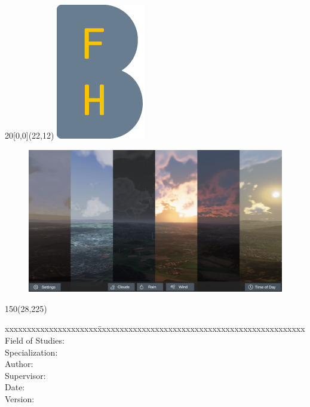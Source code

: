 
\begin{titlepage}

\setlength{\unitlength}{1mm}

\begin{textblock}{20}[0,0](22,12)
    \includegraphics{../img/BFH_Logo_B.png}
\end{textblock}

\begin{flushleft}

\vspace*{21mm}

\fontsize{24.88pt}{40pt}\selectfont
\textbf{\doctitle}
\vspace{2mm} 

\fontsize{17.28pt}{24pt}\selectfont\vspace{0.3em}
\docsubtitle
\vspace{6mm}

\begin{figure}[H]
    \includegraphics[width=\linewidth]{../../journal/results/promo.png}
\end{figure}

\fontsize{10pt}{12pt}\selectfont
\begin{textblock}{150}(28,225)
\begin{tabbing}
xxxxxxxxxxxxxxxxxxxxx\=xxxxxxxxxxxxxxxxxxxxxxxxxxxxxxxxxxxxxxxxxxxxxxx \kill
Field of Studies:	\> \fieldofstudies	\\
Specialization:	    \> \specialisation	\\
Author:		        \> \docauthor \\
Supervisor:         \> \prof \\
Date:			    \> \versiondate \\
Version:		     \\
\end{tabbing}


\end{textblock}
\end{flushleft}
\end{titlepage}
